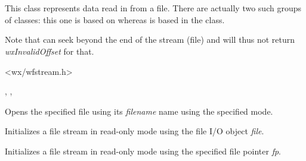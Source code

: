 \section{}\label{wxffileinputstream}

This class represents data read in from a file. There are actually
two such groups of classes: this one is based on  
whereas  is based in
the  class.

Note that  
can seek beyond the end of the stream (file) and will thus not return 
{\it wxInvalidOffset} for that.




<wx/wfstream.h>


, , 


\label{wxffileinputstreamctor}


Opens the specified file using its {\it filename} name using the specified mode.


Initializes a file stream in read-only mode using the file I/O object {\it file}.


Initializes a file stream in read-only mode using the specified file pointer {\it fp}.

\label{wxffileinputstreamdtor}



